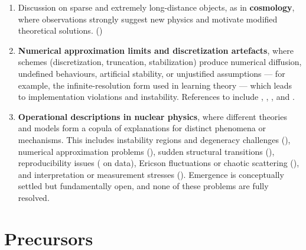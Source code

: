 \begin{enumerate}[leftmargin=0.5cm,topsep=1pt,itemsep=1pt]
\item[(7)] Discussion on sparse and extremely long-distance objects, as in \textbf{cosmology}, where observations strongly suggest new physics and motivate modified theoretical solutions. (\cite{Zwicky1933,Rubin1970,Riess1998,Perlmutter1999})

\item[(8)] \textbf{Numerical approximation limits and discretization artefacts}, where schemes (discretization, truncation, stabilization) produce numerical diffusion, undefined behaviours, artificial stability, or unjustified assumptions — for example, the infinite-resolution form used in learning theory — which leads to implementation violations and instability. References to include \cite{StrangFix1973,Trefethen2000,Hairer1993,LeVeque2002}, \cite{Higham2002,Wilkinson1963,Roache1998,Oberkampf2002,SanchezStern2017,Lam2010}, \cite{Zitko2009,Hu2012,Menard2021}, and \cite{Coveney2020}.

\item[(9)] \textbf{Operational descriptions in nuclear physics}, where different theories and models form a copula of explanations for distinct phenomena or mechanisms. This includes instability regions and degeneracy challenges (\cite{Otsuka2005,Warburton1990,Thielemann2017,Mumpower2016}), numerical approximation problems (\cite{Furnstahl2015,Mumpower2016}), sudden structural transitions (\cite{Iachello2001,Casten2000}), reproducibility issues (\cite{Leeb2008} on \cite{EXFOR} data), Ericson fluctuations or chaotic scattering (\cite{Ericson1960,Bohigas1984}), and interpretation or measurement stresses (\cite{Ericson1960,HauserFeshbach1952}). Emergence is conceptually settled but fundamentally open, and none of these problems are fully resolved.
\end{enumerate}
\section{Precursors}

